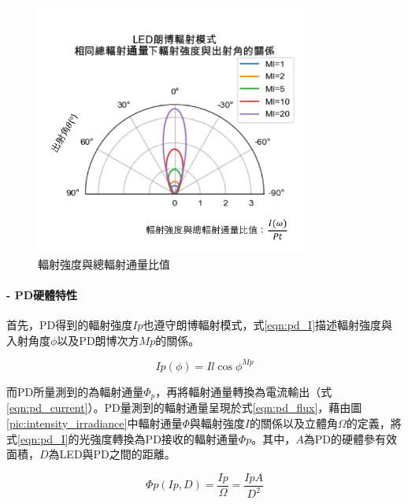                 \begin{figure}[htpb]
                    \centering
                    \includegraphics[width=9cm]{ch2pic/lambertian_led.png}
                    \caption{輻射強度與總輻射通量比值}
                    \label{pic:lambertian_led}
                \end{figure}




                \paragraph*{- PD硬體特性}

                \hfill
                
                首先，PD得到的輻射強度$Ip$也遵守朗博輻射模式，式\ref{eqn:pd_I}描述輻射強度與入射角度$\phi$以及PD朗博次方$Mp$的關係。

                \begin{equation}
                    \label{eqn:pd_I}
                    Ip(\phi) = Il \cos \phi^{Mp}
                \end{equation}

                \qquad
                而PD所量測到的為輻射通量$\Phi_p$，再將輻射通量轉換為電流輸出（式\ref{eqn:pd_current}）。PD量測到的輻射通量呈現於式\ref{eqn:pd_flux}，藉由圖\ref{pic:intensity_irradiance}中輻射通量$\Phi$與輻射強度$I$的關係以及立體角$\Omega$的定義，將式\ref{eqn:pd_I}的光強度轉換為PD接收的輻射通量$\Phi p$。其中，$A$為PD的硬體參有效面積，$D$為LED與PD之間的距離。

                \begin{equation}
                    \label{eqn:pd_flux}
                    \Phi p(Ip,D) = \frac{Ip}{\Omega} = \frac{IpA}{D^2}
                \end{equation}

